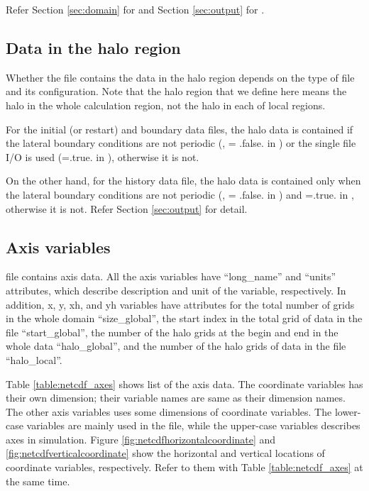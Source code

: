 \noindent Refer Section \ref{sec:domain} for  and
Section \ref{sec:output} for .


\subsection{Data in the halo region}

Whether the file 
contains the data in the halo region
depends on the type of file and its configuration.
Note that the halo region that we define here means the halo in the whole calculation region,
not the halo in each of local regions.

For the initial (or restart) and boundary data files, 
the halo data is contained if the lateral boundary conditions are not periodic 
(,  = .false. in ) 
or the single file I/O is used (=.true. in ),
otherwise it is not.

On the other hand,
for the history data file, 
the halo data is contained 
only when the lateral boundary conditions are not periodic
(,  = .false. in )
and =.true. in ,
otherwise it is not. Refer Section \ref{sec:output} for detail.

\subsection{Axis variables}
\scalenetcdf file contains axis data.
All the axis variables have 
``long\_name'' and ``units'' attributes,
which describe description and unit of the variable, respectively.
In addition, x, y, xh, and yh variables 
have attributes for the total number of grids in the whole domain ``size\_global'',
the start index in the total grid of data in the file ``start\_global'',
the number of the halo grids at the begin and end in the whole data ``halo\_global'',
and the number of the halo grids of data in the file ``halo\_local''.

Table \ref{table:netcdf_axes} shows list of the axis data.
The coordinate variables has their own dimension; their variable names are same as their dimension names.
The other axis variables uses some dimensions of coordinate variables.
The lower-case variables are mainly used in the file, 
while the upper-case variables describes axes in simulation.
Figure \ref{fig:netcdfhorizontalcoordinate} and \ref{fig:netcdfverticalcoordinate} show 
the horizontal and vertical locations of coordinate variables,
respectively.
Refer to them with Table \ref{table:netcdf_axes} at the same time.

